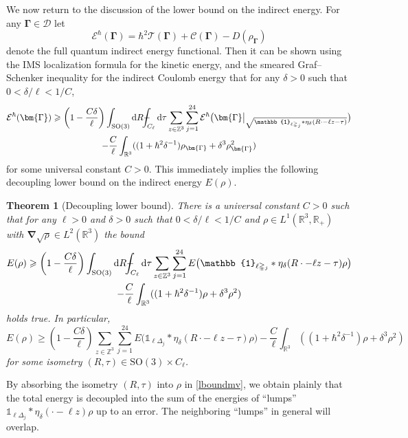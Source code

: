 \documentclass[final,onefignum,onetabnum,reqno]{amsart}
\newtheorem{theorem}{Theorem}[section]
\theoremstyle{remark}
\renewcommand{\ge}{\geqslant}
\newcommand{\RR}{\mathbb{R}}
\newcommand{\ZZ}{\mathbb{Z}}
\newcommand{\vGamma}{{\bm{\Gamma}}} %
\newcommand{\SO}{\mathrm{SO}}
\newcommand{\iden}{\mathbb{1}} %
\newcommand{\grad}{\bm{\nabla}} %
\newcommand{\tetra}{\mathbb{\Delta}} %
\newcommand{\dd}{\mathrm{d}} %
\newcommand{\dm}{\mathcal{D}} %
\def\Xint#1{\mathchoice
{\XXint\displaystyle\textstyle{#1}}%
{\XXint\textstyle\scriptstyle{#1}}%
{\XXint\scriptstyle\scriptscriptstyle{#1}}%
{\XXint\scriptscriptstyle\scriptscriptstyle{#1}}%
\!\int}
\def\XXint#1#2#3{{\setbox0=\hbox{$#1{#2#3}{\int}$ }
\vcenter{\hbox{$#2#3$ }}\kern-.6\wd0}}
\def\dashint{\Xint-}
\newcommand{\TC}{\mathcal{T}}
\newcommand{\EC}{\mathcal{E}}
\newcommand{\Cc}{\mathcal{C}}
\begin{document}
We now return to the discussion of the lower bound on the indirect energy. For any $\vGamma\in\dm$ let
$$
\EC^\hbar(\vGamma)=\hbar^2\TC(\vGamma)+\Cc(\vGamma)-D(\rho_\vGamma)
$$
denote the full quantum indirect energy functional. 
Then it can be shown \cite{lewin2020local} using the IMS localization formula for the kinetic energy, and the smeared Graf--Schenker inequality for the indirect Coulomb energy that for any $\delta>0$ such that $0<\delta/\ell<1/C$,
\begin{multline}\label{indlowbd}
\EC^\hbar(\vGamma)\ge \left(1-\frac{C\delta}{\ell}\right) \int_{\SO(3)}\dd R  \dashint_{C_{\ell}}\dd \tau
\sum_{z\in\ZZ^3} \sum_{j=1}^{24} \EC^\hbar\bigl({\vGamma\bigr|}_{\sqrt{\iden_{\ell\tetra_j} * \eta_\delta(R\cdot - \ell z - \tau)}}\bigr)\\
 -\frac{C}{\ell} \int_{\RR^3} ((1+\hbar^2\delta^{-1})\rho_\vGamma + \delta^3\rho_\vGamma^2 )
\end{multline}
for some universal constant $C>0$. This immediately implies the following decoupling lower bound
on the indirect energy $E(\rho)$. 

\begin{theorem}[Decoupling lower bound]\label{lboundthm}
There is a universal constant $C>0$ such that for any $\ell>0$ and $\delta>0$ such that $0<\delta/\ell<1/C$ and $\rho\in L^1(\RR^3,\RR_+)$ with $\grad\sqrt{\rho}\in L^2(\RR^3)$ the bound
\begin{multline*}
E(\rho)\ge \left(1-\frac{C\delta}{\ell}\right) \int_{\SO(3)}\dd R  \dashint_{C_{\ell}}\dd \tau
\sum_{z\in\ZZ^3} \sum_{j=1}^{24} E\bigl(\iden_{\ell\tetra_j} * \eta_\delta(R\cdot - \ell z - \tau)\rho\bigr)\\
 -\frac{C}{\ell} \int_{\RR^3} ((1+\hbar^2\delta^{-1})\rho + \delta^3\rho^2 )
\end{multline*}
holds true. In particular, 
\begin{equation}\label{lboundmv}
E(\rho)\ge \left(1-\frac{C\delta}{\ell}\right)
\sum_{z\in\ZZ^3} \sum_{j=1}^{24} E\bigl(\iden_{\ell\tetra_j} * \eta_\delta(R\cdot - \ell z - \tau)\rho\bigr)
 -\frac{C}{\ell} \int_{\RR^3} ((1+\hbar^2\delta^{-1})\rho + \delta^3\rho^2 )
\end{equation}
for some isometry $(R,\tau)\in\SO(3)\times C_\ell$. 
\end{theorem}

By absorbing the isometry $(R,\tau)$ into $\rho$ in \cref{lboundmv}, we obtain plainly that the total energy is decoupled into the sum of the energies of ``lumps'' $\iden_{\ell\tetra_j} * \eta_\delta(\cdot - \ell z)\rho$ up to an error. The neighboring ``lumps'' in general will overlap. 
\end{document}
